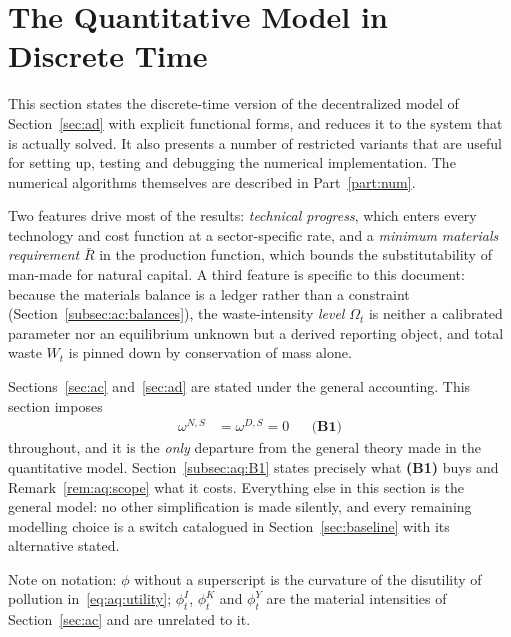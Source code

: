 
\section{The Quantitative Model in Discrete Time}
\label{sec:aq}

This section states the discrete-time version of the decentralized model of Section~\ref{sec:ad} with explicit functional forms, and reduces it to the system that is actually solved. It also presents a number of restricted variants that are useful for setting up, testing and debugging the numerical implementation. The numerical algorithms themselves are described in Part~\ref{part:num}.

Two features drive most of the results: \emph{technical progress}, which enters every technology and cost function at a sector-specific rate, and a \emph{minimum materials requirement} $\bar R$ in the production function, which bounds the substitutability of man-made for natural capital. A third feature is specific to this document: because the materials balance is a ledger rather than a constraint (Section~\ref{subsec:ac:balances}), the waste-intensity \emph{level} $\Omega_t$ is neither a calibrated parameter nor an equilibrium unknown but a derived reporting object, and total waste $W_t$ is pinned down by conservation of mass alone.

 Sections~\ref{sec:ac} and~\ref{sec:ad} are stated under the general accounting. This section imposes
\begin{align}
\omega^{N,S} &= \omega^{D,S} = 0
&&\textbf{(B1)}
\label{eq:aq:B1}
\end{align}
throughout, and it is the \emph{only} departure from the general theory made in the quantitative model. Section~\ref{subsec:aq:B1} states precisely what \textbf{(B1)} buys and Remark~\ref{rem:aq:scope} what it costs. Everything else in this section is the general model: no other simplification is made silently, and every remaining modelling choice is a switch catalogued in Section~\ref{sec:baseline} with its alternative stated.

Note on notation: $\phi$ without a superscript is the curvature of the disutility of pollution in~\eqref{eq:aq:utility}; $\phi^I_t$, $\phi^K_t$ and $\phi^Y_t$ are the material intensities of Section~\ref{sec:ac} and are unrelated to it.

